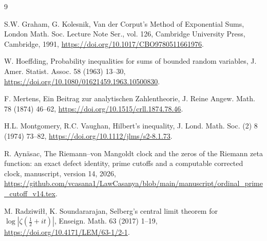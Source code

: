 \documentclass[11pt,reqno]{amsart}
\numberwithin{equation}{section}
\theoremstyle{plain}
\theoremstyle{definition}
\theoremstyle{remark}
\begin{document}
\begin{thebibliography}{9}

S.W. Graham, G. Kolesnik, Van der Corput's Method of Exponential Sums, London Math. Soc. Lecture Note Ser., vol. 126, Cambridge University Press, Cambridge, 1991, \href{https://doi.org/10.1017/CBO9780511661976}{https://doi.org/10.1017/CBO9780511661976}.

W. Hoeffding, Probability inequalities for sums of bounded random variables, J. Amer. Statist. Assoc. 58 (1963) 13--30, \href{https://doi.org/10.1080/01621459.1963.10500830}{https://doi.org/10.1080/01621459.1963.10500830}.

F. Mertens, Ein Beitrag zur analytischen Zahlentheorie, J. Reine Angew. Math. 78 (1874) 46--62, \href{https://doi.org/10.1515/crll.1874.78.46}{https://doi.org/10.1515/crll.1874.78.46}.

H.L. Montgomery, R.C. Vaughan, Hilbert's inequality, J. Lond. Math. Soc. (2) 8 (1974) 73--82, \href{https://doi.org/10.1112/jlms/s2-8.1.73}{https://doi.org/10.1112/jlms/s2-8.1.73}.

R. Ayn\"asac, The Riemann--von Mangoldt clock and the zeros of the Riemann zeta function: an exact defect identity, prime cutoffs and a computable corrected clock, manuscript, version 14, 2026, \href{https://github.com/vcasana1/LawCasanya/blob/main/manuscript/ordinal_prime_cutoff_v14.tex}{https://github.com/vcasana1/LawCasanya/blob/main/manuscript/ordinal\_prime\_cutoff\_v14.tex}.

M. Radziwi\l\l, K. Soundararajan, Selberg's central limit theorem for $\log|\zeta(\frac12+it)|$, Enseign. Math. 63 (2017) 1--19, \href{https://doi.org/10.4171/LEM/63-1/2-1}{https://doi.org/10.4171/LEM/63-1/2-1}.

\end{thebibliography}
\end{document}
